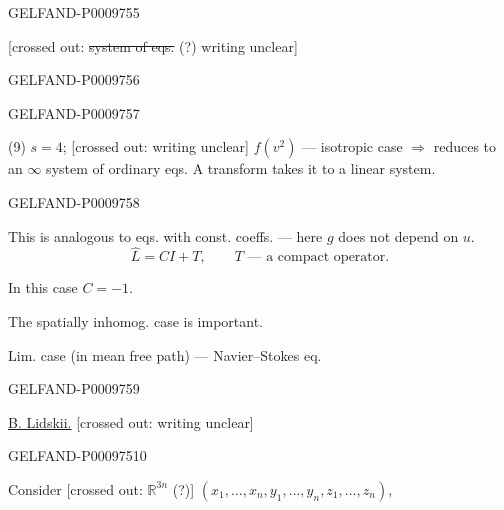 \begin{GelfandAdjacentEvidence}{GELFAND-P000975}{5}


[crossed out: \sout{system of eqs.} (?) writing unclear]
\end{GelfandAdjacentEvidence}
\begin{GelfandAdjacentEvidence}{GELFAND-P000975}{6}

\end{GelfandAdjacentEvidence}
\begin{GelfandAdjacentEvidence}{GELFAND-P000975}{7}


(9) $s=4$; [crossed out: writing unclear] $f(v^2)$ --- isotropic case $\Rightarrow$
reduces to an $\infty$ system of ordinary eqs. A transform takes it to a linear system.
\end{GelfandAdjacentEvidence}
\begin{GelfandAdjacentEvidence}{GELFAND-P000975}{8}



This is analogous to eqs. with const. coeffs. --- here $g$ does not depend on $u$.
\begin{equation*}
 \widehat L=CI+T,\qquad T\text{ --- a compact operator}.
 \tag{10}
\end{equation*}

In this case $C=-1$.

The spatially inhomog. case is important.

Lim. case (in mean free path) --- Navier–Stokes eq.
\end{GelfandAdjacentEvidence}
\begin{GelfandAdjacentEvidence}{GELFAND-P000975}{9}


\underline{B. Lidskii.} [crossed out: writing unclear]
\end{GelfandAdjacentEvidence}
\begin{GelfandAdjacentEvidence}{GELFAND-P000975}{10}


Consider [crossed out: \sout{\(\mathbb R^{3n}\)} (?)]
$(x_1,\ldots,x_n,y_1,\ldots,y_n,z_1,\ldots,z_n)$,
\end{GelfandAdjacentEvidence}

